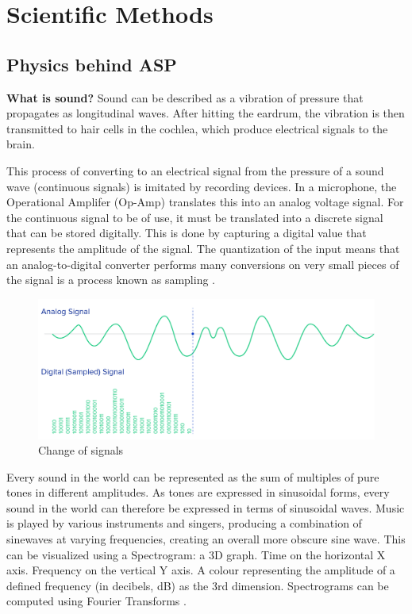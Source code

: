 \documentclass[a4paper,12pt]{article}
\begin{document}
\newpage
\section{Scientific Methods}
\subsection{Physics behind ASP}
\textbf{What is sound?} Sound can be described as a vibration of pressure that propagates as longitudinal waves.
After hitting the eardrum, the vibration is then transmitted to hair cells in the cochlea, which produce electrical signals
to the brain.
\newline

This process of converting to an electrical signal from the pressure of a sound wave (continuous signals) is imitated by recording devices.
In a microphone, the Operational Amplifer (Op-Amp) translates this into an analog voltage signal.
For the continuous signal to be of use, it must be translated into a discrete signal that can be stored digitally. 
This is done by capturing a digital value that represents the amplitude of the signal. 
The quantization of the input means that an analog-to-digital converter performs many conversions on very small pieces of the signal is a process known as sampling \parencite{AdvancePhysicsTextBook}.

\begin{figure}[h!]
    \centering
    \includegraphics[width=10.5 cm]{analoguetodigital.png}
    \caption{Change of signals \parencite{ShazamASP}}
\end{figure}

Every sound in the world can be represented as the sum of multiples of pure tones in different amplitudes.
As tones are expressed in sinusoidal forms, every sound in the world can therefore be expressed in terms of sinusoidal waves.
Music is played by various instruments and singers, producing a combination of sinewaves at varying frequencies, creating an overall
more obscure sine wave. This can be visualized using a Spectrogram: a 3D graph. Time on the horizontal X axis. Frequency on the vertical Y axis.
A colour representing the amplitude of a defined frequency (in decibels, dB) as the 3rd dimension. Spectrograms can be computed using Fourier Transforms \parencite{ThinkDSP}.
\end{document}
